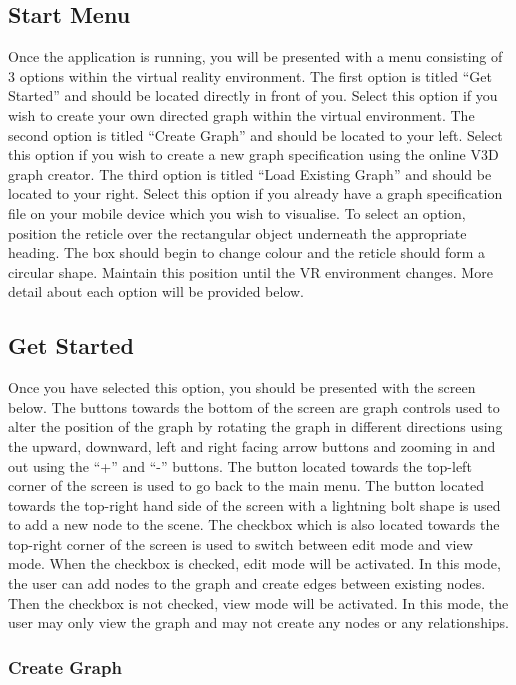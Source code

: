 \documentclass[english]{article}
\begin{document}
\subsection{Start Menu}
Once the application is running, you will be presented with a menu consisting of 3 options within the virtual reality environment. The first option is titled “Get Started” and should be located directly in front of you. Select this option if you wish to create your own directed graph within the virtual environment. The second option is titled “Create Graph” and should be located to your left. Select this option if you wish to create a new graph specification using the online V3D graph creator. The third option is titled “Load Existing Graph” and should be located to your right. Select this option if you already have a graph specification file on your mobile device which you wish to visualise. To select an option, position the reticle over the rectangular object underneath the appropriate heading. The box should begin to change colour and the reticle should form a circular shape. Maintain this position until the VR environment changes. More detail about each option will be provided below.

\subsection{Get Started}
Once you have selected this option, you should be presented with the screen below. The buttons towards the bottom of the screen are graph controls used to alter the position of the graph by rotating the graph in different directions using the upward, downward, left and right facing arrow buttons and zooming in and out using the “+” and “-” buttons. The button located towards the top-left corner of the screen is used to go back to the main menu. The button located towards the top-right hand side of the screen with a lightning bolt shape is used to add a new node to the scene. The checkbox which is also located towards the top-right corner of the screen is used to switch between edit mode and view mode. When the checkbox is checked, edit mode will be activated. In this mode, the user can add nodes to the graph and create edges between existing nodes. Then the checkbox is not checked, view mode will be activated. In this mode, the user may only view the graph and may not create any nodes or any relationships. 

\subsubsection{Create Graph}
\end{document}
